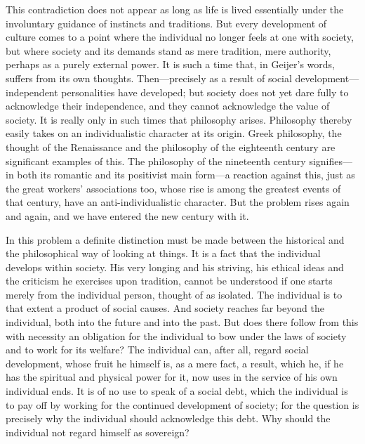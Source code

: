 \documentclass[12pt]{article}
\newcommand{\opage}[1]{\marginnote{\footnotesize\textit{[#1]}}}
\begin{document}
This contradiction does not appear as long as life is lived essentially under
the involuntary guidance of instincts and traditions. But every development of
culture comes to a point where the individual no longer feels at one with
society, but where society and its demands stand as mere tradition, mere
authority, perhaps as a purely external power. It is such a time that, in
Geijer's words, suffers from its own thoughts. Then---precisely as a result of
social development---independent personalities have developed; but society does
not yet dare fully to acknowledge their independence, and they cannot
acknowledge the value of society. It is really only in such times that
philosophy arises. Philosophy thereby easily takes on an individualistic
character at its origin. Greek philosophy, the thought of the Renaissance and
the philosophy of the eighteenth century are
\opage{42}%
significant examples of this. The philosophy of the nineteenth century
signifies---in both its romantic and its positivist main form---a reaction
against this, just as the great workers' associations too, whose rise is among
the greatest events of that century, have an anti-individualistic character.
But the problem rises again and again, and we have entered the new century with
it.

In this problem a definite distinction must be made between the historical and
the philosophical way of looking at things. It is a fact that the individual
develops within society. His very longing and his striving, his ethical ideas
and the criticism he exercises upon tradition, cannot be understood if one
starts merely from the individual person, thought of as isolated. The
individual is to that extent a product of social causes. And society reaches far
beyond the individual, both into the future and into the past. But does there
follow from this with necessity an obligation for the individual to bow under
the laws of society and to work for its welfare? The individual can, after all,
regard social development, whose fruit he himself is, as a mere fact, a result,
which he,
\opage{43}%
if he has the spiritual and physical power for it, now uses in the service of
his own individual ends. It is of no use to speak of a social debt, which the
individual is to pay off by working for the continued development of society;
for the question is precisely why the individual should acknowledge this debt.
Why should the individual not regard himself as sovereign?
\end{document}
